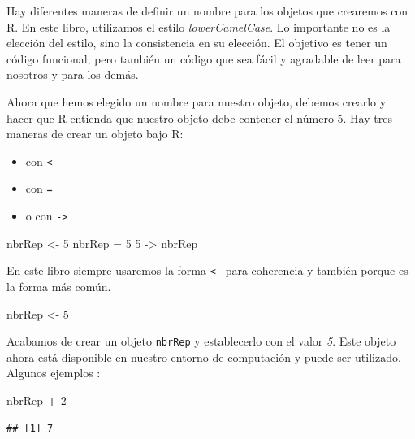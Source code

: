 \documentclass[]{book}
\makeatletter
\newenvironment{Shaded}{\begin{snugshade}}{\end{snugshade}}
\newcommand{\DecValTok}[1]{\textcolor[rgb]{0.00,0.00,0.81}{#1}}
\newcommand{\StringTok}[1]{\textcolor[rgb]{0.31,0.60,0.02}{#1}}
\newcommand{\OperatorTok}[1]{\textcolor[rgb]{0.81,0.36,0.00}{\textbf{#1}}}
\newcommand{\NormalTok}[1]{#1}
\providecommand{\tightlist}{%
  \setlength{\itemsep}{0pt}\setlength{\parskip}{0pt}}
\newenvironment{kframe}{%
\medskip{}
\setlength{\fboxsep}{.8em}
 \def\at@end@of@kframe{}%
 \ifinner\ifhmode%
  \def\at@end@of@kframe{\end{minipage}}%
  \begin{minipage}{\columnwidth}%
 \fi\fi%
 \def\FrameCommand##1{\hskip\@totalleftmargin \hskip-\fboxsep
 \colorbox{shadecolor}{##1}\hskip-\fboxsep
     \hskip-\linewidth \hskip-\@totalleftmargin \hskip\columnwidth}%
 \MakeFramed {\advance\hsize-\width
   \@totalleftmargin\z@ \linewidth\hsize
   \@setminipage}}%
 {\par\unskip\endMakeFramed%
 \at@end@of@kframe}
\newenvironment{rmdblock}[1]
  {
  \begin{itemize}
  \renewcommand{\labelitemi}{
    \raisebox{-.7\height}[0pt][0pt]{
      {\setkeys{Gin}{width=3em,keepaspectratio}\texttt{[image: myIcons/\#1]}} %
    }
  }
  \setlength{\fboxsep}{1em}
  \begin{kframe}
  \item
  }
  {
  \end{kframe}
  \end{itemize}
  }
\newenvironment{rmdstyle}     %
  {\begin{rmdblock}{style}}   %
  {\end{rmdblock}}            %
\makeatother
\begin{document}
\begin{rmdstyle}
Hay diferentes maneras de definir un nombre para los objetos que
crearemos con R. En este libro, utilizamos el estilo
\emph{lowerCamelCase}. Lo importante no es la elección del estilo, sino
la consistencia en su elección. El objetivo es tener un código
funcional, pero también un código que sea fácil y agradable de leer para
nosotros y para los demás.
\end{rmdstyle}

Ahora que hemos elegido un nombre para nuestro objeto, debemos crearlo y
hacer que R entienda que nuestro objeto debe contener el número 5. Hay
tres maneras de crear un objeto bajo R:

\begin{itemize}
\tightlist
\item
  con \texttt{\textless{}-}
\item
  con \texttt{=}
\item
  o con \texttt{-\textgreater{}}
\end{itemize}

\begin{Shaded}
\begin{Highlighting}[]
\NormalTok{nbrRep <-}\StringTok{ }\DecValTok{5}
\NormalTok{nbrRep =}\StringTok{ }\DecValTok{5}
\DecValTok{5}\NormalTok{ ->}\StringTok{ }\NormalTok{nbrRep}
\end{Highlighting}
\end{Shaded}

En este libro siempre usaremos la forma \texttt{\textless{}-} para
coherencia y también porque es la forma más común.

\begin{Shaded}
\begin{Highlighting}[]
\NormalTok{nbrRep <-}\StringTok{ }\DecValTok{5}
\end{Highlighting}
\end{Shaded}

Acabamos de crear un objeto \texttt{nbrRep} y establecerlo con el valor
\emph{5}. Este objeto ahora está disponible en nuestro entorno de
computación y puede ser utilizado. Algunos ejemplos :

\begin{Shaded}
\begin{Highlighting}[]
\NormalTok{nbrRep }\OperatorTok{+}\StringTok{ }\DecValTok{2}
\end{Highlighting}
\end{Shaded}

\begin{verbatim}
## [1] 7
\end{verbatim}
\end{document}
